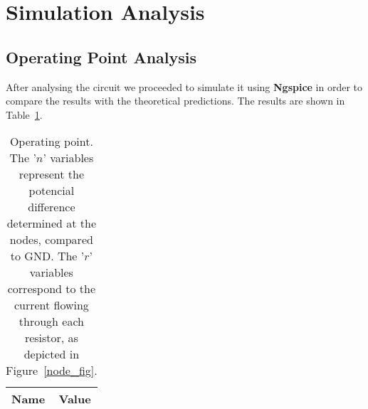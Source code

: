 \newpage

\section{Simulation Analysis}
\label{sec:simulation}

\subsection{Operating Point Analysis}
\label{sec:op_point}

After analysing the circuit we proceeded to simulate it using {\bf Ngspice} in order to compare the results with the theoretical predictions. The results are shown in Table~\ref{tab:op}.


\begin{table}[H]
	\centering
	\begin{tabular}{|l|c|}
		\hline    
		    {\bf Name} & {\bf Value} \\
                    \hline
                    \hline
		
	\end{tabular}
	\caption{Operating point. The '$n$' variables represent the potencial difference determined at the nodes, compared to GND. The '$r$' variables correspond to the current flowing through each resistor, as depicted in Figure~\ref{node_fig}.}
	\label{tab:op}
\end{table}
